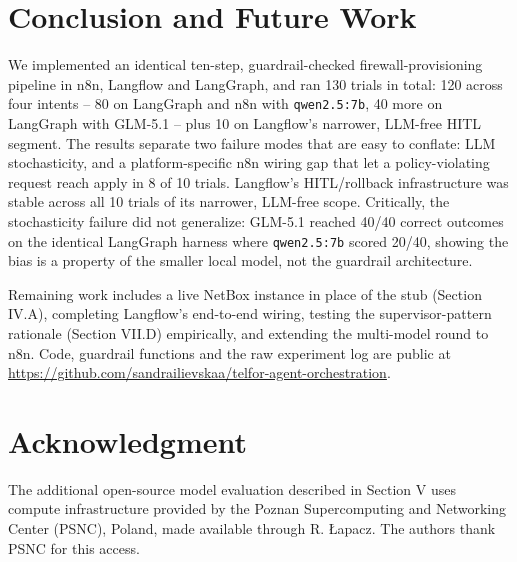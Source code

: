 \documentclass[conference]{IEEEtran}
\begin{document}
\section{Conclusion and Future Work}
We implemented an identical ten-step, guardrail-checked firewall-provisioning pipeline in n8n, Langflow and LangGraph, and ran 130 trials in total: 120 across four intents -- 80 on LangGraph and n8n with \texttt{qwen2.5:7b}, 40 more on LangGraph with GLM-5.1 -- plus 10 on Langflow's narrower, LLM-free HITL segment. The results separate two failure modes that are easy to conflate: LLM stochasticity, and a platform-specific n8n wiring gap that let a policy-violating request reach apply in 8 of 10 trials. Langflow's HITL/rollback infrastructure was stable across all 10 trials of its narrower, LLM-free scope. Critically, the stochasticity failure did not generalize: GLM-5.1 reached 40/40 correct outcomes on the identical LangGraph harness where \texttt{qwen2.5:7b} scored 20/40, showing the bias is a property of the smaller local model, not the guardrail architecture.

Remaining work includes a live NetBox instance in place of the stub (Section IV.A), completing Langflow's end-to-end wiring, testing the supervisor-pattern rationale (Section VII.D) empirically, and extending the multi-model round to n8n. Code, guardrail functions and the raw experiment log are public at \url{https://github.com/sandrailievskaa/telfor-agent-orchestration}.

\section*{Acknowledgment}
The additional open-source model evaluation described in Section V uses compute infrastructure provided by the Poznan Supercomputing and Networking Center (PSNC), Poland, made available through R. {\L}apacz. The authors thank PSNC for this access.
\end{document}
